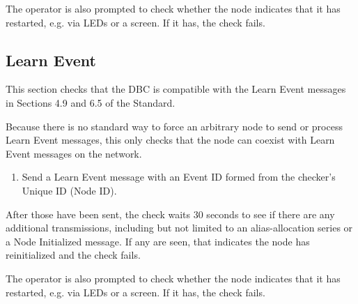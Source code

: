 The operator is also prompted to check whether the node indicates that it has
restarted, e.g. via LEDs or a screen.  If it has, the check fails.

\subsection{Learn Event}

This section checks that the DBC is compatible with the
Learn Event messages in Sections 4.9 and 6.5 of the Standard.

Because there is no standard way to force an arbitrary
node to send or process Learn Event messages,
this only checks
that the node can coexist with Learn Event messages on the network.

\begin{enumerate}
\item Send a Learn Event message with 
    an Event ID  formed from the checker's Unique ID (Node ID).
\end{enumerate}

After those have been sent, the check waits 30 seconds to see if there are any additional
transmissions, including but not limited to an alias-allocation series or a Node
Initialized message. If any are seen, that indicates the node has reinitialized
and the check fails.

The operator is also prompted to check whether the node indicates that it has
restarted, e.g. via LEDs or a screen.  If it has, the check fails.

  
